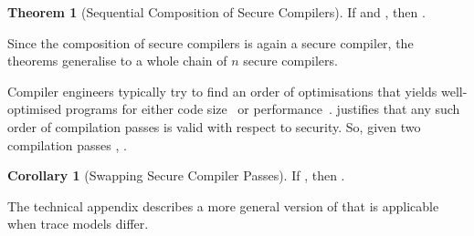 \documentclass[dvipsnames,conference]{IEEEtran}
\theoremstyle{definition}
\newtheorem{theorem}{Theorem}[section]
\newtheorem{corollary}{Corollary}[section]
\begin{document}
\begin{theorem}[Sequential Composition of Secure Compilers]\label{thm:rtp}
  If  and , then . \Coqed
\end{theorem}

Since the composition of secure compilers is again a secure compiler, the theorems generalise to a whole chain of $n$ secure compilers.

Compiler engineers typically try to find an order of optimisations that yields well-optimised programs for either code size~\cite{cooper1999geneticphases} or performance~\cite{kulkarni2006exhaustivephase}.
 justifies that any such order of compilation passes is valid with respect to security.
So, given two compilation passes , .
% 

\begin{corollary}[Swapping Secure Compiler Passes]\label{corr:swappable}
  If , then . \Coqed
\end{corollary}

The technical appendix describes a more general version of  that is applicable when trace models differ.
\end{document}
